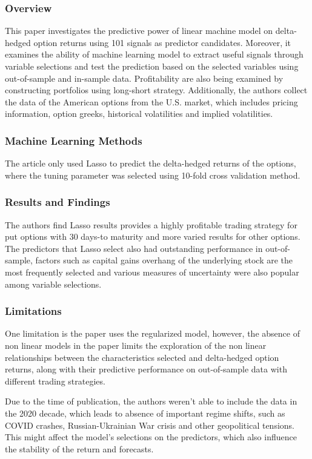 \documentclass[oneside, 12pt]{article}
\newcommand*{\1}{\text{\scalebox{1.1}{\usefont{U}{bbold}{m}{n}1}}}
\begin{document}
\subsubsection{Overview}
This paper investigates the predictive power of linear machine model on delta-hedged option returns using 101 signals as predictor candidates. Moreover, it examines the ability of machine learning model to extract useful signals through variable selections and test the prediction based on the selected variables using out-of-sample and in-sample data. Profitability are also being examined by constructing portfolios using long-short strategy. Additionally, the authors collect the data of the American options from the U.S. market, which includes pricing information, option greeks, historical volatilities and implied volatilities. 

\subsubsection{Machine Learning Methods}
The article only used Lasso to predict the delta-hedged returns of the options, where the tuning parameter was selected using 10-fold cross validation method. 

\subsubsection{Results and Findings}
The authors find Lasso results provides a highly profitable trading strategy for put options with 30 days-to maturity and more varied results for other options. The predictors that Lasso select also had outstanding performance in out-of-sample, factors such as capital gains overhang of the underlying stock are the most frequently selected and various measures of uncertainty were also popular among variable selections. 

\subsubsection{Limitations}
One limitation is the paper uses the regularized model, however, the absence of non linear models in the paper limits the exploration of the non linear relationships between the characteristics selected and delta-hedged option returns, along with their predictive performance on out-of-sample data with different trading strategies. \newline

Due to the time of publication, the authors weren't able to include the data in the 2020 decade, which leads to absence of important regime shifts, such as COVID crashes, Russian-Ukrainian War crisis and other geopolitical tensions. This might affect the model's selections on the predictors, which also influence the stability of the return and forecasts. 
\end{document}
